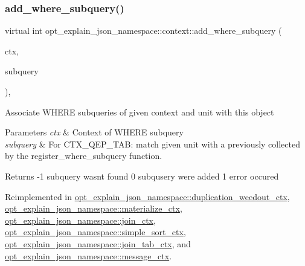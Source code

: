 \subsubsection{\texorpdfstring{add\+\_\+where\+\_\+subquery()}{add\_where\_subquery()}}
{\footnotesize\ttfamily virtual int opt\+\_\+explain\+\_\+json\+\_\+namespace\+::context\+::add\+\_\+where\+\_\+subquery (\begin{DoxyParamCaption}\item[{\mbox{\hyperlink{classopt__explain__json__namespace_1_1subquery__ctx}{subquery\+\_\+ctx}} $\ast$}]{ctx,  }\item[{S\+E\+L\+E\+C\+T\+\_\+\+L\+E\+X\+\_\+\+U\+N\+IT $\ast$}]{subquery }\end{DoxyParamCaption})\hspace{0.3cm}{\ttfamily [inline]}, {\ttfamily [virtual]}}

Associate W\+H\+E\+RE subqueries of given context and unit with this object


\begin{DoxyParams}{Parameters}
{\em ctx} & Context of W\+H\+E\+RE subquery \\
\hline
{\em subquery} & For C\+T\+X\+\_\+\+Q\+E\+P\+\_\+\+T\+AB\+: match given unit with a previously collected by the register\+\_\+where\+\_\+subquery function. \\
\hline
\end{DoxyParams}
\begin{DoxyReturn}{Returns}
-\/1 subquery wasn\textquotesingle{}t found 0 subqusery were added 1 error occured 
\end{DoxyReturn}


Reimplemented in \mbox{\hyperlink{classopt__explain__json__namespace_1_1duplication__weedout__ctx_ab9ed2cd6372ca07ead08bbe7ad56db22}{opt\+\_\+explain\+\_\+json\+\_\+namespace\+::duplication\+\_\+weedout\+\_\+ctx}}, \mbox{\hyperlink{classopt__explain__json__namespace_1_1materialize__ctx_ae6715f07cfd160747433ad80fd78deac}{opt\+\_\+explain\+\_\+json\+\_\+namespace\+::materialize\+\_\+ctx}}, \mbox{\hyperlink{classopt__explain__json__namespace_1_1join__ctx_a6d8ebc9b02d479b1b93d2a55b1e1f5ef}{opt\+\_\+explain\+\_\+json\+\_\+namespace\+::join\+\_\+ctx}}, \mbox{\hyperlink{classopt__explain__json__namespace_1_1simple__sort__ctx_a334cf6e47221f587df9e1012819cf19d}{opt\+\_\+explain\+\_\+json\+\_\+namespace\+::simple\+\_\+sort\+\_\+ctx}}, \mbox{\hyperlink{classopt__explain__json__namespace_1_1join__tab__ctx_a6884d85a538e28bfac75c41159438d01}{opt\+\_\+explain\+\_\+json\+\_\+namespace\+::join\+\_\+tab\+\_\+ctx}}, and \mbox{\hyperlink{classopt__explain__json__namespace_1_1message__ctx_ade9097446404901fe19bd29cf0070cd0}{opt\+\_\+explain\+\_\+json\+\_\+namespace\+::message\+\_\+ctx}}.

